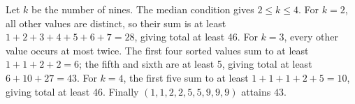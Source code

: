 Let $k$ be the number of nines. The median condition gives $2\le k\le4$. For $k=2$, all other values are distinct, so their sum is at least $1+2+3+4+5+6+7=28$, giving total at least 46. For $k=3$, every other value occurs at most twice. The first four sorted values sum to at least $1+1+2+2=6$; the fifth and sixth are at least 5, giving total at least $6+10+27=43$. For $k=4$, the first five sum to at least $1+1+1+2+5=10$, giving total at least 46. Finally $(1,1,2,2,5,5,9,9,9)$ attains $\boxed{43}$.
